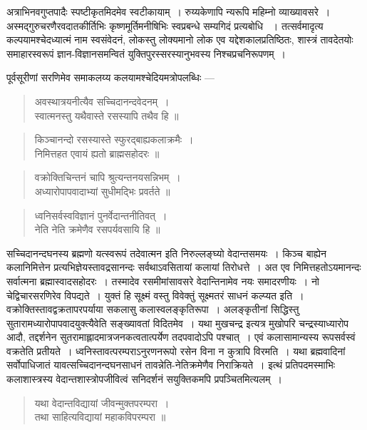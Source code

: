 {\dev अत्राभिनवगुप्तपादैः स्पष्टीकृतमिदमेव स्वटीकायाम्~। रुय्यकेणापि न्यरूपि महिम्नो व्याख्यावसरे~। अस्मद्गुरुचरणैरवदातकीर्तिभिः कृष्णमूर्तिमनीषिभिः स्वप्रबन्धे सम्यगिदं प्रत्यबोधि}  {\dev~। तत्सर्वमादृत्य कल्पयामश्चेदध्यात्मं नाम स्वसंवेदनं, लोकस्तु लोक्यमानो लोक एव यद्देशकालप्रतिष्ठितः, शास्त्रं तावदेतयोः समाहारस्वरूपं ज्ञान-विज्ञानसमन्वितं युक्तिपुरस्सरस्यानुभवस्य निश्चप्रचनिरूपणम्~।}   

{\dev पूर्वसूरीणां सरणिमेव समाकलय्य कलयामश्चेदियमत्रोपलब्धिः ---}
\begin{quote}
{\dev अवस्थात्रयनीत्यैव सच्चिदानन्दवेदनम्~।}\\
{\dev स्वात्मनस्तु यथैवास्ते रसस्यापि तथैव हि ॥}
\end{quote}
\begin{quote}
{\dev किञ्चानन्दो रसस्यास्ते स्फुरद्बाह्यकलाक्रमैः~।}\\
{\dev निमित्तहत एवायं ह्यतो ब्राह्मसहोदरः ॥}
\end{quote}
\begin{quote}
{\dev वक्रोक्तिचिन्तनं चापि श्रुत्यन्तनयसन्निभम्~।}\\
{\dev अध्यारोपापवादाभ्यां सुधीमद्भिः प्रवर्तते ॥}
\end{quote}
\begin{quote}
{\dev ध्वनिसर्वस्वविज्ञानं पुनर्वेदान्तनीतिवत्~।}\\
{\dev नेति नेति क्रमेणैव रसपर्यवसायि हि ॥}
\end{quote}

{\dev सच्चिदानन्दघनस्य ब्रह्मणो यत्स्वरूपं तदेवात्मन इति निरुल्लङ्घ्यो वेदान्तसमयः~। किञ्च बाह्येन कलानिमित्तेन प्रत्यभिज्ञेयस्तावद्रसानन्दः सर्वथाऽवसितायां कलायां तिरोधत्ते~। अत एव निमित्तहतोऽयमानन्दः सर्वात्मना ब्रह्मास्वादसहोदरः~। तस्मादेव रसमीमांसावसरे वेदान्तिनामेव नयः समादरणीयः~। नो चेद्विचारसरणिरेव विपद्यते~। युक्तं हि सूक्ष्मं वस्तु विवेक्तुं सूक्ष्मतरं साधनं कल्प्यत इति~। वक्रोक्तिस्तावद्वक्रतापरपर्याया सकलासु कलास्वलङ्कृतिरूपा~। अलङ्कृतीनां सिद्धिस्तु सुतारामध्यारोपापवादयुक्त्यैवेति सङ्ख्यावतां विदितमेव~। यथा मुखचन्द्र इत्यत्र मुखोपरि चन्द्रस्याध्यारोप आदौ, तद्दर्शनेन सुतरामाह्लादमात्रजनकत्वतात्पर्येण तदपवादोऽपि पश्चात्~।  एवं कलासामान्यस्य रूपसर्वस्वं वक्रतेति प्रतीयते~। ध्वनिस्तावत्परम्पराऽनुरणनरूपो रसेन विना न कुत्रापि विरमति~। यथा ब्रह्मवादिनां सर्वोपाधिजातं यावत्सच्चिदानन्दघनसाधनं तावन्नेति-नेतिक्रमेणैव निराक्रियते~। इत्थं प्रतिपदमस्माभिः कलाशास्त्रस्य वेदान्तशास्त्रोपजीवित्वं सनिदर्शनं सयुक्तिकमपि प्रपञ्चितमित्यलम्~।}
\begin{quote}
{\dev यथा वेदान्तविद्यायां जीवन्मुक्तपरम्परा~।}\\
{\dev तथा साहित्यविद्यायां महाकविपरम्परा ॥}
\end{quote}

